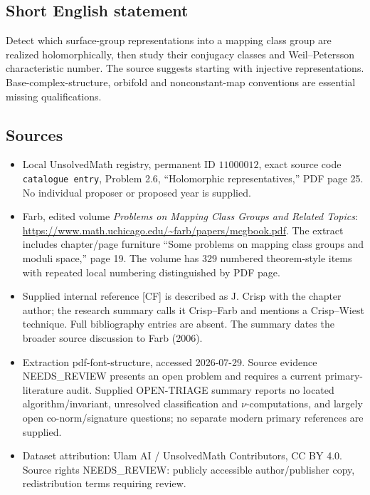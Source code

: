 \documentclass[11pt]{article}
\begin{document}
\subsection{Short English statement}
Detect which surface-group representations into a mapping class group are realized holomorphically, then study their conjugacy classes and Weil--Petersson characteristic number. The source suggests starting with injective representations. Base-complex-structure, orbifold and nonconstant-map conventions are essential missing qualifications.
\subsection{Sources}
\begin{itemize}
\item Local UnsolvedMath registry, permanent ID \(11000012\), exact source code \texttt{catalogue entry}, Problem 2.6, ``Holomorphic representatives,'' PDF page 25. No individual proposer or proposed year is supplied.
\item Farb, edited volume \emph{Problems on Mapping Class Groups and Related Topics}: \url{https://www.math.uchicago.edu/~farb/papers/mcgbook.pdf}. The extract includes chapter/page furniture ``Some problems on mapping class groups and moduli space,'' page 19. The volume has 329 numbered theorem-style items with repeated local numbering distinguished by PDF page.
\item Supplied internal reference [CF] is described as J. Crisp with the chapter author; the research summary calls it Crisp--Farb and mentions a Crisp--Wiest technique. Full bibliography entries are absent. The summary dates the broader source discussion to Farb (2006).
\item Extraction pdf-font-structure, accessed 2026-07-29. Source evidence NEEDS\_REVIEW presents an open problem and requires a current primary-literature audit. Supplied OPEN-TRIAGE summary reports no located algorithm/invariant, unresolved classification and \(\nu\)-computations, and largely open co-norm/signature questions; no separate modern primary references are supplied.
\item Dataset attribution: Ulam AI / UnsolvedMath Contributors, CC BY 4.0. Source rights NEEDS\_REVIEW: publicly accessible author/publisher copy, redistribution terms requiring review.
\end{itemize}
\end{document}
